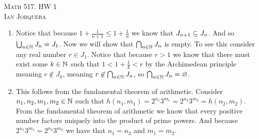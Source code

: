 \documentclass[12pt]{amsart}
\begin{document}
\begin{center}
    \textsc{Math 517. HW 1\\ Ian Jorquera}
\end{center}
\vspace{1em}

\begin{enumerate}
\item Notice that because $1+\frac{1}{n+1}\leq 1+\frac{1}{n}$ we know that $J_{n+1} \subseteq J_n$. And so $\bigcup_{n\in\mathbb{N}}J_n=J_1$. 
Now we will show that $\bigcap_{n\in\mathbb{N}}J_n$ is empty. To see this consider any real number $r\in J_1$. Notice that because $r>1$ 
we know that there must exist some $k\in \mathbb{N}$ such that $1<1+\frac{1}{k}<r$ by the Archimedean principle meaning $r\not\in J_{k}$, 
meaning $r\not\in \bigcap_{n\in\mathbb{N}}J_n$, so $\bigcap_{n\in\mathbb{N}}J_n=\varnothing$.\\

\item This follows from the fundamental theorem of arithmetic. Consider $n_1,n_2,m_1,m_2\in \mathbb{N}$ such that 
$h(n_1,m_1)=2^{n_1}3^{m_1}=2^{n_2}3^{m_2}=h(n_2,m_2)$. From the fundamental theorem of arithmetic we know that every positive number
factors uniquely into the product of prime powers. And because $2^{n_1}3^{m_1}=2^{n_2}3^{m_2}$ we have that $n_1=n_2$ and $m_1=m_2$.\\



\end{enumerate}
\end{document}
